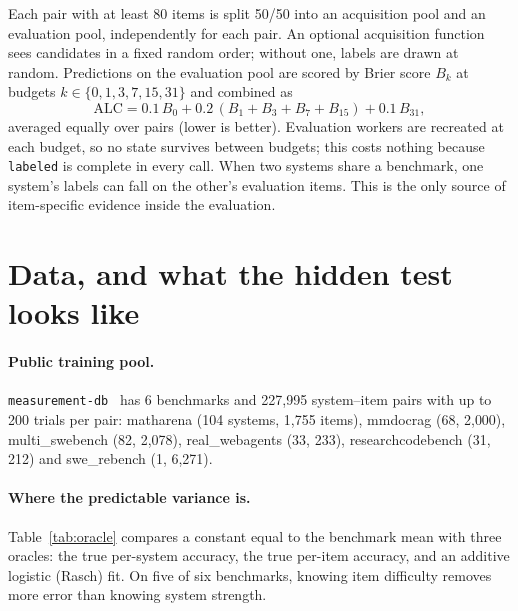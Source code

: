 \documentclass{article}
\newcommand{\ALC}{\mathrm{ALC}}
\begin{document}
Each pair with at least 80 items is split 50/50 into an acquisition pool and an evaluation pool, independently for each pair. An
optional acquisition function sees candidates in a fixed random order; without one, labels are drawn at random. Predictions on the
evaluation pool are scored by Brier score $B_k$ at budgets $k \in \{0,1,3,7,15,31\}$ and combined as
\begin{equation}
  \ALC = 0.1\,B_0 + 0.2\,(B_1 + B_3 + B_7 + B_{15}) + 0.1\,B_{31},
\end{equation}
averaged equally over pairs (lower is better). Evaluation workers are recreated at each budget, so no state survives between budgets;
this costs nothing because \texttt{labeled} is complete in every call. When two systems share a benchmark, one system's labels can
fall on the other's evaluation items. This is the only source of item-specific evidence inside the evaluation.

\section{Data, and what the hidden test looks like}
\label{sec:data}

\paragraph{Public training pool.} \texttt{measurement-db}~\cite{measurementdb} has 6 benchmarks and 227{,}995 system--item pairs
with up to 200 trials per pair: matharena (104 systems, 1{,}755 items), mmdocrag (68, 2{,}000), multi\_swebench (82, 2{,}078),
real\_webagents (33, 233), researchcodebench (31, 212) and swe\_rebench (1, 6{,}271).

\paragraph{Where the predictable variance is.} Table~\ref{tab:oracle} compares a constant equal to the benchmark mean with three
oracles: the true per-system accuracy, the true per-item accuracy, and an additive logistic (Rasch) fit. On five of six benchmarks,
knowing item difficulty removes more error than knowing system strength.
\end{document}
